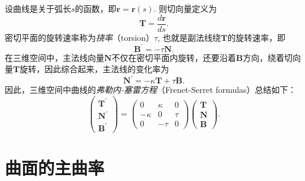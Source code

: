 \documentclass{article}
\begin{document}
设曲线是关于弧长$s$的函数，即$\mathbf{r}=\mathbf{r}(s)$.
则切向量定义为
\begin{equation*}
    \mathbf{T}=\frac{d\mathbf{r}}{ds}.
\end{equation*}
密切平面的旋转速率称为\emph{挠率}（torsion）$\tau$, 也就是副法线绕$\mathbf{T}$的旋转速率，即
\begin{equation}
    \mathbf{B}^{\prime}=-\tau\mathbf{N}.
\end{equation}
在三维空间中，主法线向量$\mathbf{N}$不仅在密切平面内旋转，还要沿着$\mathbf{B}$方向，绕着切向量$\mathbf{T}$旋转，因此综合起来，主法线的变化率为
\begin{equation}
    \mathbf{N}^{\prime}=-\kappa\mathbf{T}+\tau\mathbf{B}.
\end{equation}
因此，三维空间中曲线的\emph{弗勒内-塞雷方程}（Frenet-Serret formulas）总结如下：
\begin{equation}
    \begin{pmatrix}
        \mathbf{T}^{\prime} \\
        \mathbf{N}^{\prime} \\
        \mathbf{B}^{\prime}
    \end{pmatrix}
    =
    \begin{pmatrix}
        0 & \kappa & 0 \\
        -\kappa & 0 & \tau \\
        0 & -\tau & 0
    \end{pmatrix}
    \begin{pmatrix}
        \mathbf{T} \\
        \mathbf{N} \\
        \mathbf{B}
    \end{pmatrix}.
\end{equation}

\section{曲面的主曲率}
\end{document}
